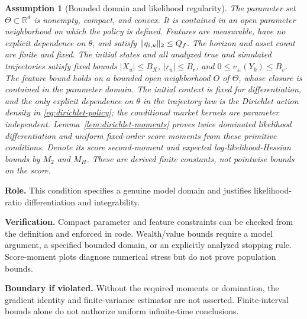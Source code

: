 \documentclass[11pt]{article}
\newtheorem{assumption}[theorem]{Assumption}
\newcommand{\R}{\mathbb R}
\newcommand{\1}{\mathbf 1}
\DeclarePairedDelimiter{\norm}{\lVert}{\rVert}
\theoremstyle{definition}
\newcommand{\assess}[3]{\par\noindent\textbf{Role.} #1\par\noindent\textbf{Verification.} #2\par\noindent\textbf{Boundary if violated.} #3\par\medskip}
\begin{document}
\begin{assumption}[Bounded domain and likelihood regularity]\label{ass:bounded}
The parameter set $\Theta\subset\R^d$ is nonempty, compact, and convex. It is contained in an open parameter neighborhood on which the policy is defined. Features are measurable, have no explicit dependence on $\theta$, and satisfy $\norm{q_{i,u}}_2\le Q_f$. The horizon and asset count are finite and fixed. The initial states and all analyzed true and simulated trajectories satisfy fixed bounds $|X_u|\le B_X$, $|r_u|\le B_r$, and $0\le v_\pm(Y_k)\le B_v$. The feature bound holds on a bounded open neighborhood $O$ of $\Theta$, whose closure is contained in the parameter domain. The initial context is fixed for differentiation, and the only explicit dependence on $\theta$ in the trajectory law is the Dirichlet action density in \eqref{eq:dirichlet-policy}; the conditional market kernels are parameter independent. Lemma~\ref{lem:dirichlet-moments} proves twice dominated likelihood differentiation and uniform fixed-order score moments from these primitive conditions. Denote its score second-moment and expected log-likelihood-Hessian bounds by $M_2$ and $M_H$. These are derived finite constants, not pointwise bounds on the score.
\end{assumption}
\assess{This condition specifies a genuine model domain and justifies likelihood-ratio differentiation and integrability.}{Compact parameter and feature constraints can be checked from the definition and enforced in code. Wealth/value bounds require a model argument, a specified bounded domain, or an explicitly analyzed stopping rule. Score-moment plots diagnose numerical stress but do not prove population bounds.}{Without the required moments or domination, the gradient identity and finite-variance estimator are not asserted. Finite-interval bounds alone do not authorize uniform infinite-time conclusions.}
\end{document}
